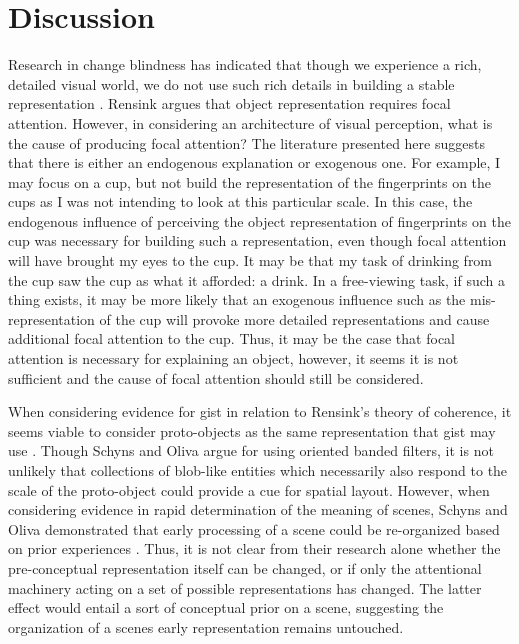 \documentclass[a4paper,11pt,final]{ThesisStyle}
\begin{document}


\section{Discussion}

Research in change blindness has indicated that though we experience a rich, detailed visual world, we do not use such rich details in building a stable representation \cite{Simons1997}.  Rensink argues that object representation requires focal attention.  However, in considering an architecture of visual perception, what is the cause of producing focal attention?  The literature presented here suggests that there is either an endogenous explanation or exogenous one.  For example, I may focus on a cup, but not build the representation of the fingerprints on the cups as I was not intending to look at this particular scale.  In this case, the endogenous influence of perceiving the object representation of fingerprints on the cup was necessary for building such a representation, even though focal attention will have brought my eyes to the cup.  It may be that my task of drinking from the cup saw the cup as what it afforded: a drink.  In a free-viewing task, if such a thing exists, it may be more likely that an exogenous influence such as the mis-representation of the cup will provoke more detailed representations and cause additional focal attention to the cup.  Thus, it may be the case that focal attention is necessary for explaining an object, however, it seems it is not sufficient and the cause of focal attention should still be considered.  

When considering evidence for gist in relation to Rensink's theory of coherence, it seems viable to consider proto-objects as the same representation that gist may use \cite{Rensink2002}.  Though Schyns and Oliva argue for using oriented banded filters, it is not unlikely that collections of blob-like entities which necessarily also respond to the scale of the proto-object could provide a cue for spatial layout.   However, when considering evidence in rapid determination of the meaning of scenes, Schyns and Oliva demonstrated that early processing of a scene could be re-organized based on prior experiences \cite{Schyns1994,Oliva1997}.  Thus, it is not clear from their research alone whether the pre-conceptual representation itself can be changed, or if only the attentional machinery acting on a set of possible representations has changed.  The latter effect would entail a sort of conceptual prior on a scene, suggesting the organization of a scenes early representation remains untouched.
\end{document}
